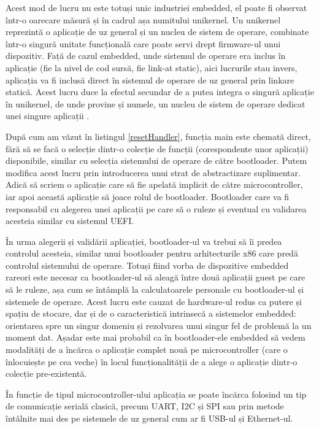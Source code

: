 \documentclass[12pt,a4paper,titlepage]{report}
\begin{document}
Acest mod de lucru nu este totuși unic industriei embedded, el poate fi observat într-o oarecare măsură și în cadrul așa numitului unikernel. Un unikernel reprezintă o aplicație de uz general \cite{barbu} și un nucleu de sistem de operare, combinate într-o singură unitate funcțională care poate servi drept firmware-ul unui dispozitiv. Față de cazul embedded, unde sistemul de operare era inclus în aplicație (fie la nivel de cod sursă, fie link-at static), aici lucrurile stau invers, aplicația va fi inclusă direct în sistemul de operare de uz general prin linkare statică. Acest lucru duce la efectul secundar de a putea integra o singură aplicație în unikernel, de unde provine și numele, un nucleu de sistem de operare dedicat unei singure aplicații \cite{kantee}.

După cum am văzut în listingul \ref{resetHandler}, funcția main este chemată direct, fără să se facă o selecție dintr-o colecție de funcții (corespondente unor aplicații) disponibile, similar cu selecția sistemului de operare de către bootloader.
Putem modifica acest lucru prin introducerea unui strat de abstractizare suplimentar. Adică să scriem o aplicație care să fie apelată implicit de către microcontroller, iar apoi această aplicație să joace rolul de bootloader. Bootloader care va fi responsabil cu alegerea unei aplicații pe care să o ruleze și eventual cu validarea acesteia similar cu sistemul UEFI.

În urma alegerii și validării aplicației, bootloader-ul va trebui să îi predea controlul acesteia, similar unui bootloader pentru arhitecturile x86 care predă controlul sistemului de operare. Totuși fiind vorba de dispozitive embedded rareori este necesar ca bootloader-ul să aleagă între două aplicații guest pe care să le ruleze, așa cum se întâmplă la calculatoarele personale cu bootloader-ul și sistemele de operare. Acest lucru este cauzat de hardware-ul redus ca putere și spațiu de stocare, dar și de o caracteristică intrinsecă a sistemelor embedded: orientarea spre un singur domeniu și rezolvarea unui singur fel de problemă la un moment dat. Așadar este mai probabil ca în bootloader-ele embedded să vedem modalități de a încărca o aplicație complet nouă pe microcontroller (care o înlocuiește pe cea veche) în locul funcționalității de a alege o aplicație dintr-o colecție pre-existentă.

În funcție de tipul microcontroller-ului aplicația se poate încărca folosind un tip de comunicație serială clasică, precum UART, I2C și SPI sau prin metode întâlnite mai des pe sistemele de uz general cum ar fi USB-ul și Ethernet-ul.
\end{document}

